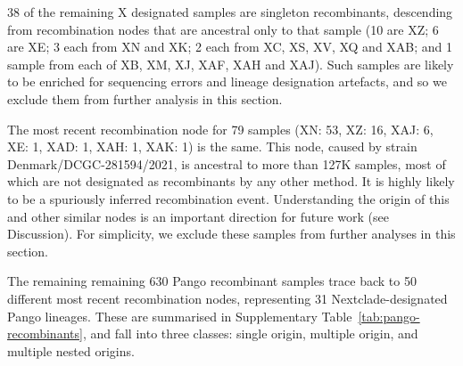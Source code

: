 \documentclass{article}
\begin{document}
38 of the remaining X designated samples are singleton recombinants, descending
from recombination nodes that are ancestral only to that sample (10 are XZ; 6
are XE;  3 each from XN and XK; 2 each from XC, XS, XV, XQ and XAB; and 1
sample from each of XB, XM, XJ, XAF, XAH and XAJ). Such samples are likely to
be enriched for sequencing errors and lineage designation artefacts, and so we
exclude them from further analysis in this section.

The most recent recombination node for 79 samples (XN: 53, XZ: 16, XAJ: 6, XE:
1, XAD: 1, XAH: 1, XAK: 1) is the same. This node, caused by strain Denmark/DCGC-281594/2021,
is ancestral to more than 127K samples, most of which are not designated as
recombinants by any other method. It is highly likely to be a spuriously inferred recombination event.
Understanding the origin of this and other similar nodes is an important
direction for future work (see Discussion). For simplicity, we exclude these
samples from further analyses in this section.

The remaining remaining 630 Pango recombinant samples trace back to 50 different
most recent recombination nodes, representing 31
Nextclade-designated Pango lineages. These are summarised
in Supplementary Table~\ref{tab:pango-recombinants}, and fall
into three classes: single origin, multiple origin,
and multiple nested origins.


\end{document}
